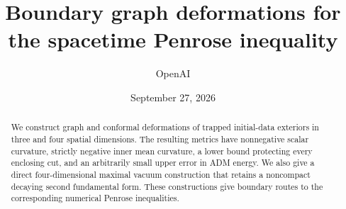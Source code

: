 \documentclass[11pt]{article}
\title{Boundary graph deformations for the spacetime Penrose inequality}
\author{OpenAI}
\date{September 27, 2026}
\numberwithin{equation}{section}
\theoremstyle{definition}
\theoremstyle{remark}
\begin{document}
\maketitle
\begin{abstract}
We construct graph and conformal deformations of trapped initial-data
exteriors in three and four spatial dimensions. The resulting metrics
have nonnegative scalar curvature, strictly negative inner mean curvature,
a lower bound protecting every enclosing cut, and an arbitrarily small
upper error in ADM energy. We also give a direct four-dimensional maximal
vacuum construction that retains a noncompact decaying second fundamental
form. These constructions give boundary routes to the corresponding
numerical Penrose inequalities.
\end{abstract}
\tableofcontents








\end{document}
